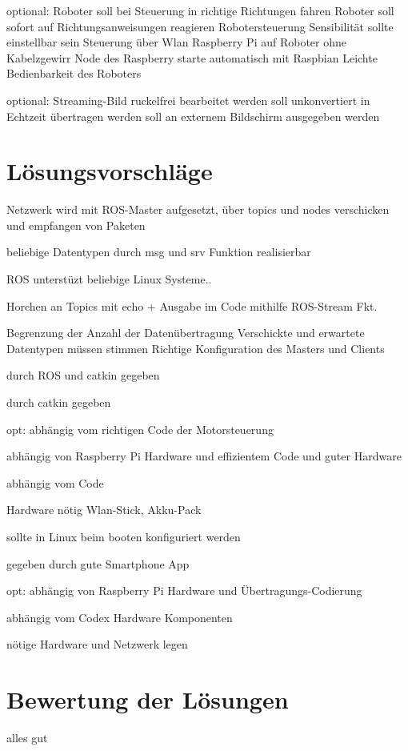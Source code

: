 \documentclass[12pt]{article}
\begin{document}
optional:
Roboter soll bei Steuerung in richtige Richtungen fahren
Roboter soll sofort auf Richtungsanweisungen reagieren
Robotersteuerung Sensibilität sollte einstellbar sein
Steuerung über Wlan
Raspberry Pi auf Roboter ohne Kabelzgewirr
Node des Raspberry starte automatisch mit Raspbian
Leichte Bedienbarkeit des Roboters

optional:
Streaming-Bild ruckelfrei bearbeitet werden
soll unkonvertiert in Echtzeit übertragen werden
soll an externem Bildschirm ausgegeben werden

\section{Lösungsvorschläge}

Netzwerk wird mit ROS-Master aufgesetzt, über topics und nodes
verschicken und empfangen von Paketen 

beliebige Datentypen durch msg und srv Funktion realisierbar

ROS unterstüzt beliebige Linux Systeme..

Horchen an Topics mit echo + Ausgabe im Code mithilfe ROS-Stream Fkt.

Begrenzung der Anzahl der Datenübertragung
Verschickte und erwartete Datentypen müssen stimmen
Richtige Konfiguration des Masters und Clients

durch ROS und catkin gegeben 

durch catkin gegeben

opt:
abhängig vom richtigen Code der Motorsteuerung

abhängig von Raspberry Pi Hardware und effizientem Code und
guter Hardware

abhängig vom Code

Hardware nötig Wlan-Stick, Akku-Pack 

sollte in Linux beim booten konfiguriert werden

gegeben durch gute Smartphone App

opt:
abhängig von Raspberry Pi Hardware und Übertragungs-Codierung

abhängig vom Codex Hardware Komponenten

nötige Hardware und Netzwerk legen

\section{Bewertung der Lösungen}

alles gut
\end{document}
